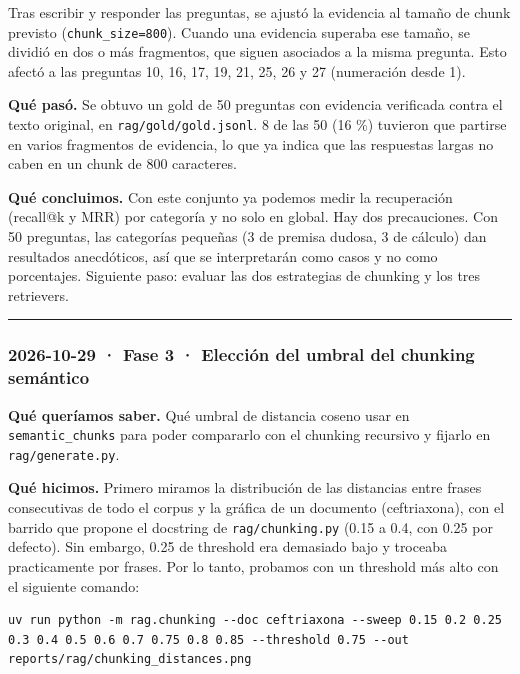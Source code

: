 Tras escribir y responder las preguntas, se ajustó la evidencia al tamaño de chunk previsto (\texttt{chunk\_\allowbreak{}size=\allowbreak{}800}). Cuando una evidencia superaba ese tamaño, se dividió en dos o más fragmentos, que siguen asociados a la misma pregunta. Esto afectó a las preguntas 10, 16, 17, 19, 21, 25, 26 y 27 (numeración desde 1).

\textbf{Qué pasó.} Se obtuvo un gold de 50 preguntas con evidencia verificada contra el texto original, en \texttt{rag/\allowbreak{}gold/\allowbreak{}gold.jsonl}. 8 de las 50 (16 \%) tuvieron que partirse en varios fragmentos de evidencia, lo que ya indica que las respuestas largas no caben en un chunk de 800 caracteres.

\textbf{Qué concluimos.} Con este conjunto ya podemos medir la recuperación (recall@k y MRR) por categoría y no solo en global. Hay dos precauciones. Con 50 preguntas, las categorías pequeñas (3 de premisa dudosa, 3 de cálculo) dan resultados anecdóticos, así que se interpretarán como casos y no como porcentajes. Siguiente paso: evaluar las dos estrategias de chunking y los tres retrievers.

\begin{center}\rule{0.5\linewidth}{0.5pt}\end{center}

\subsubsection{2026-10-29 · Fase 3 · Elección del umbral del chunking semántico}

\textbf{Qué queríamos saber.} Qué umbral de distancia coseno usar en \texttt{semantic\_\allowbreak{}chunks} para poder
compararlo con el chunking recursivo y fijarlo en \texttt{rag/\allowbreak{}generate.py}.

\textbf{Qué hicimos.} Primero miramos la distribución de las distancias entre frases consecutivas de
todo el corpus y la gráfica de un documento (ceftriaxona), con el barrido que propone el
docstring de \texttt{rag/\allowbreak{}chunking.py} (0.15 a 0.4, con 0.25 por defecto). Sin embargo, 0.25 de threshold era demasiado bajo y troceaba practicamente por frases. Por lo tanto, probamos con un threshold más alto con el siguiente comando:

\begin{lstlisting}
uv run python -m rag.chunking --doc ceftriaxona --sweep 0.15 0.2 0.25 0.3 0.4 0.5 0.6 0.7 0.75 0.8 0.85 --threshold 0.75 --out reports/rag/chunking_distances.png
\end{lstlisting}

